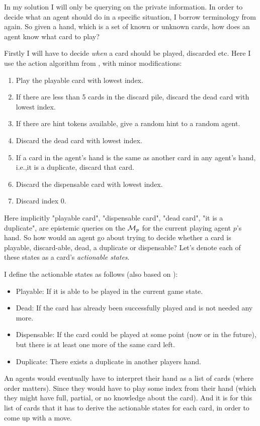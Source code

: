 In my solution I will only be querying on the private information. 
In order to decide what an agent should do in a specific situation, I borrow terminology from \cite{CoxEtAl2015} again. So given a hand, which is a set of known or unknown cards, how does an agent know what card to play?

Firstly I will have to decide \emph{when} a card should be played, discarded etc. Here I use the action algorithm from \cite{CoxEtAl2015}, with minor modifications:
\begin{enumerate}
	\item Play the playable card with lowest index.
	\item If there are less than 5 cards in the discard pile, discard the dead card with lowest index.
	\item If there are hint tokens available, give a random hint to a random agent.
	\item Discard the dead card with lowest index.
	\item If a card in the agent’s hand is the same as another card in any agent’s hand, i.e.,it is a duplicate, discard that card.
	\item Discard the dispensable card with lowest index.
	\item Discard index 0.
\end{enumerate}

Here implicitly "playable card", "dispensable card", "dead card", "it is a duplicate", are epistemic queries on the $\mathcal{M}_p$ for the current playing agent $p$'s hand. So how would an agent go about trying to decide whether a card is playable, discard-able, dead, a duplicate or dispensable? Let's denote each of these states as a card's \emph{actionable states}.

I define the actionable states as follows (also based on \cite{CoxEtAl2015}):
\begin{itemize}
	\item Playable: If it is able to be played in the current game state.
	\item Dead: If the card has already been successfully played and is not needed any more.
	\item Dispensable: If the card could be played at some point (now or in the future), but there is at least one more of the same card left.
	\item Duplicate: There exists a duplicate in another players hand.
\end{itemize}

An agents would eventually have to interpret their hand as a list of cards (where order matters). Since they would have to play some index from their hand (which they might have full, partial, or no knowledge about the card).
And it is for this list of cards that it has to derive the actionable states for each card, in order to come up with a move.

